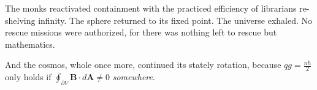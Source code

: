 \begin{tcolorbox}[colback=gray!5,colframe=gray!40,boxrule=0.5pt,arc=3pt,boxsep=10pt,left=8pt,right=8pt,top=8pt,bottom=8pt]
\medskip

The monks reactivated containment with the practiced efficiency of librarians re-shelving infinity. The sphere returned to its fixed point. The universe exhaled. No rescue missions were authorized, for there was nothing left to rescue but mathematics.

\medskip

And the cosmos, whole once more, continued its stately rotation, because $q g = \frac{n\hbar}{2}$ only holds if $\oint_{\partial V} \mathbf{B} \cdot d\mathbf{A} \ne 0$
\emph{somewhere}.

\end{tcolorbox}


